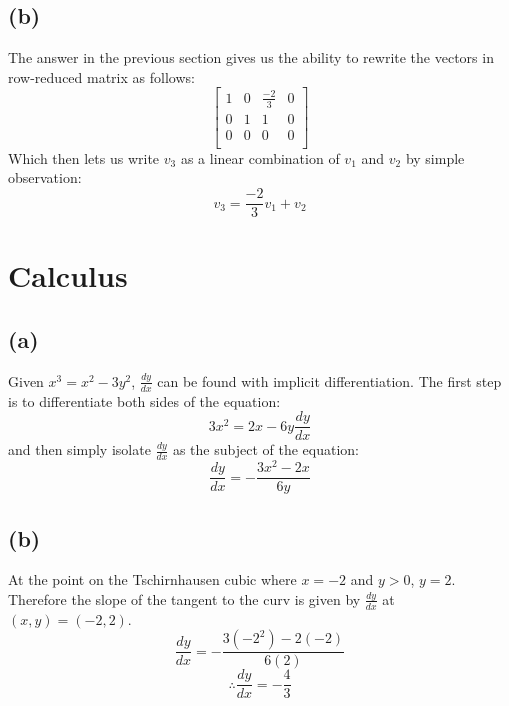 \documentclass[11pt]{article}
\begin{document}
\subsection*{(b)}
The answer in the previous section gives us the ability to rewrite the vectors in row-reduced matrix as follows:
$$\begin{bmatrix}
1 & 0 & \frac{-2}{3} & 0\\
0 & 1 & 1 & 0\\
0 & 0 & 0 & 0\\
\end{bmatrix}$$
Which then lets us write $v_3$ as a linear combination of $v_1$ and $v_2$ by simple observation:
$$v_3=\frac{-2}{3}v_1+v_2$$

\section*{Calculus}
\subsection*{(a)}
Given $x^3=x^2-3y^2$, $\frac{dy}{dx}$ can be found with implicit differentiation.
The first step is to differentiate both sides of the equation:
$$3x^2=2x-6y\frac{dy}{dx}$$
and then simply isolate $\frac{dy}{dx}$ as the subject of the equation:
$$\frac{dy}{dx}=-\frac{3x^2-2x}{6y}$$
\subsection*{(b)}
At the point on the Tschirnhausen cubic where $x=-2$ and $y>0$, $y=2$. Therefore the slope of the tangent to the curv is given by $\frac{dy}{dx}$ at $(x,y)=(-2,2)$.
$$\frac{dy}{dx}=-\frac{3(-2^2)-2(-2)}{6(2)}$$
$$\therefore \frac{dy}{dx}=-\frac{4}{3}$$
\end{document}
